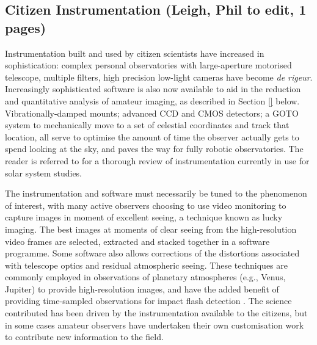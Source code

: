 \documentclass{ar2e}
\begin{document}

\subsection{Citizen Instrumentation (\textbf{Leigh}, Phil to edit, 1 pages)}
\label{sec:instr}

Instrumentation built and used by citizen scientists have increased in
sophistication: complex personal observatories with large-aperture motorised
telescope, multiple filters, high precision low-light cameras have become {\it
de rigeur}.  Increasingly sophisticated software is also now available to aid
in the reduction and quantitative analysis of amateur imaging, as described in
Section \ref{} below.  Vibrationally-damped mounts; advanced CCD and CMOS
detectors; a GOTO system to mechanically move to a set of celestial
coordinates and track that location, all serve to optimise the amount of time
the observer actually gets to spend looking at the sky, and paves the way for
fully robotic observatories.  The reader is referred to \citet{13mousis} for a
thorough review of instrumentation currently in use for solar system studies.

The instrumentation and software must necessarily be tuned to the phenomenon
of interest, with many active observers choosing to use video monitoring to
capture images in moment of excellent seeing, a technique known as lucky
imaging.  The best images at moments of clear seeing from the high-resolution
video frames are selected, extracted and stacked together in a software
programme.  Some software also allows corrections of the distortions
associated with telescope optics and residual atmospheric seeing.  These
techniques are commonly employed in observations of planetary atmospheres
(e.g., Venus, Jupiter) to provide high-resolution images, and have the added
benefit of providing time-sampled observations for impact flash detection
\citep[e.g.,][]{10hueso}.
The science contributed has been driven by the instrumentation available to
the citizens, but in some cases amateur observers have undertaken their own
customisation work to contribute new information to the field.  



% 
% 


% 
% 
\end{document}
